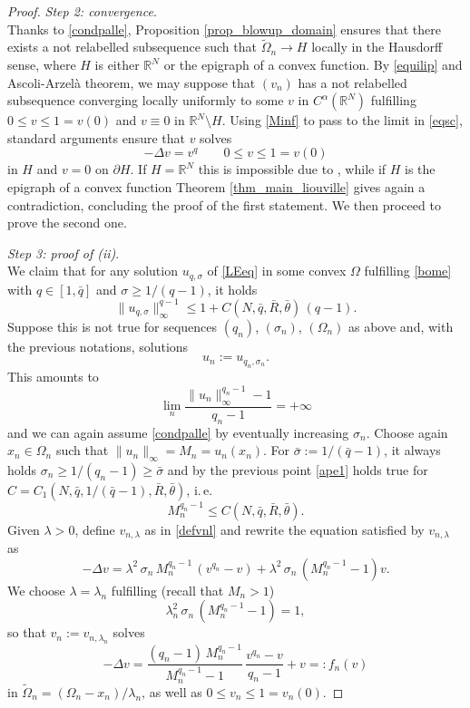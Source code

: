 \documentclass[12pt]{amsart}
\numberwithin{equation}{section}
\theoremstyle{plain}
\theoremstyle{plain}
\theoremstyle{plain}
\theoremstyle{definition}
\newcommand{\R}{{\mathbb R}}
\newcommand{\beq}{\begin{equation}}
\newcommand{\eeq}{\end{equation}}
\renewcommand{\le}{\leqslant}
\renewcommand{\ge}{\geqslant}
\begin{document}
\begin{proof}
 \smallskip
 {\em Step 2: convergence}.\\
 Thanks to \eqref{condpalle}, Proposition \ref{prop_blowup_domain} ensures that there exists a not relabelled subsequence such that $\widetilde{\Omega}_n\to H$ locally in the Hausdorff sense, where $H$ is either $\R^N$ or the epigraph of a convex function. 
By \eqref{equilip} and Ascoli-Arzelà theorem, we may suppose that $(v_n)$ has a not relabelled subsequence converging locally uniformly to some $v$ in $C^{\alpha}(\R^N)$ fulfilling $0\le v\le 1=v(0)$ and $v\equiv 0$ in $\R^N\setminus H$.
 Using \eqref{Minf} to pass to the limit in \eqref{eqsc}, standard arguments ensure that $v$ solves 
\[
-\Delta v=v^q \qquad 0\le v\le 1=v(0)
\]
in $H$ and $v=0$ on $\partial H$. If $H=\R^N$ this is impossible due to \cite[Theorem 8.1]{QuSo19}, while if $H$ is the epigraph of a convex function Theorem \ref{thm_main_liouville} gives again a contradiction, concluding the proof of the first statement. We then proceed to prove the second one.

\smallskip
{\em Step 3: proof of (ii)}.\\
We claim that for any solution $u_{q, \sigma}$ of \eqref{LEeq} in some convex $\Omega$ fulfilling \eqref{bome} with $q\in [1, \bar q]$ and $\sigma\ge 1/(q-1)$, it holds
\beq
\label{ape3}
\|u_{q, \sigma}\|_\infty^{q-1}\le 1+ C(N, \bar q, \bar R, \bar \theta)\, (q-1).
\eeq
Suppose this is not true for sequences $(q_n)$, $(\sigma_n)$, $(\Omega_n)$ as above and, with the previous notations, solutions 
\[
u_n:=u_{q_n, \sigma_n}.
\]
This amounts to 
\beq
\label{contra}
\lim_n\frac{\|u_n\|_\infty^{q_n-1}-1}{q_n-1}=+\infty 
\eeq
and we can again assume \eqref{condpalle} by eventually increasing $\sigma_n$.
Choose again $x_n\in \Omega_n$ such that $\|u_n\|_\infty=M_n=u_{n}(x_n)$. For $\bar\sigma:=1/(\bar q-1)$, it always holds $\sigma_n\ge 1/(q_n-1)\ge \bar\sigma$ and by the previous point \eqref{ape1} holds true for $C=C_1(N, \bar q, 1/(\bar q-1), \bar R, \bar\theta)$, i.\,e.
\beq
\label{label}
M_n^{q_n-1}\le C(N, \bar q, \bar R, \bar \theta).
\eeq
 Given $\lambda>0$, define $v_{n, \lambda}$ as in \eqref{defvnl} and rewrite the equation satisfied by $v_{n, \lambda}$ as 
 \[
-\Delta v=\lambda^2\, \sigma_n\, M_n^{q_n-1}\, (v^{q_n}-v) +\lambda^2\, \sigma_n\, (M_n^{q_n-1}-1) v.
\]
We choose $\lambda=\lambda_n$ fulfilling (recall that $M_n>1$)
\[
 \lambda_n^2\, \sigma_n\, (M_n^{q_n-1}-1)=1,
\]
so that $v_n:=v_{n, \lambda_n}$ solves
\beq
\label{eqsc2}
-\Delta v=\frac{(q_n-1) \, M_n^{q_n-1}}{M_n^{q_n-1}-1}\, \frac{v^{q_n}-v}{q_n-1} + v=:f_n(v)
\eeq
in $\widetilde{\Omega}_n=(\Omega_n-x_n)/\lambda_n$, as well as $0\le v_n\le 1=v_n(0)$.


\end{proof}
\end{document}
